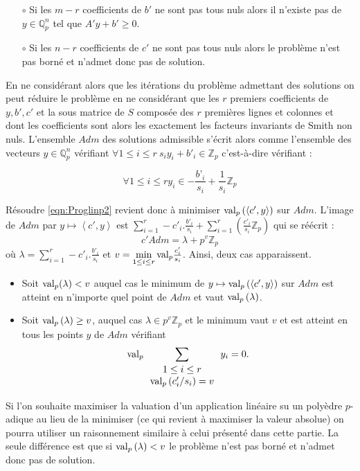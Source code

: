 \begin{propriete}
	\begin{itemize}~

		\item[$\circ$] Si les $m-r$ coefficients de $b'$ ne sont pas tous nuls alors il n'existe pas de $y \in \mathbb{Q}_{p} ^n$ tel que $A'y+b' \ge  0$.
	\item[$\circ$] Si les $n-r$ coefficients de $c'$ ne sont pas tous nuls alors le problème n'est pas borné et n'admet donc pas de solution. \end{itemize} 
\end{propriete}
En ne considérant alors que les itérations du problème admettant des solutions on peut réduire le problème en ne considérant que les $r$ premiers coefficients de $y, b', c'$ et la sous matrice de $S$ composée des $r$ premières lignes et colonnes et dont les coefficients sont alors les exactement les facteurs invariants de Smith non nuls. L'ensemble $Adm$ des solutions admissible s'écrit alors comme l'ensemble des vecteurs $y \in \mathbb{Q}_{ p } ^n$ vérifiant $
\forall 1 \le i\le r \ s_i y_i + b'_i \in \mathbb{Z}_p$ c'est-à-dire vérifiant :

\begin{equation}
	\forall 1 \le i\le r  y_i \in -\frac{b’_i}{s_i} + \frac{1}{s_i} \mathbb{Z}_p
\end{equation}
 

Résoudre \ref{eqn:Proglinp2} revient donc à minimiser $\text{val}_p\left(\left<c',y \right>\right)$ sur $Adm$. L'image de $Adm$ par $y \mapsto \left<c',y \right>$ est $\sum_{i=1}^r -c'_i.\frac{b'_i}{s_i} + \sum_{i=1}^r\left( \frac{c'_i}{s_{i}} \mathbb{Z}_p \right)$ qui se réécrit :
$$c'Adm = \lambda + p^{v} \mathbb{Z}_p$$
où $\lambda = \sum\limits_{i=1}^r -c'_i.\frac{b'_i}{s_i}$ et $v = \min\limits_{1\le i\le r} \text{val}_p \frac{c'_{i}}{s_{i}} $.
Ainsi, deux cas apparaissent.
\begin{itemize}
	\item Soit $\text{val}_p( \lambda) < v$ auquel cas le minimum de $y\mapsto \text{val}_p\left(\left<c',y \right>\right)$ sur $Adm$ est atteint en n'importe quel point de $Adm$ et vaut $\text{val}_p\left( \lambda\right)$.
	\item Soit $\text{val}_p\left( \lambda \right) \ge v$, auquel cas $\lambda \in p^{v} \mathbb{Z}_p$ et le minimum vaut $v $ et est atteint en tous les points $y$ de $Adm$ vérifiant
	$$\text{val}_p\sum \limits_{\begin{array}{c} 1\le i\le r\\ \text{val}_p\left(c'_{i}/{s_{i}} \right) = v  \end{array}   } y_{i} = 0.$$ 

\end{itemize}
\begin{remarque}
	Si l'on souhaite maximiser la valuation d'un application linéaire su un polyèdre $p$-adique au lieu de la minimiser (ce qui revient à maximiser la valeur absolue) on pourra utiliser un raisonnement similaire à celui présenté dans cette partie. La seule différence est que si $\text{val}_p\left( \lambda\right) < v$ le problème n'est pas borné et n'admet donc pas de solution. 
\end{remarque}

